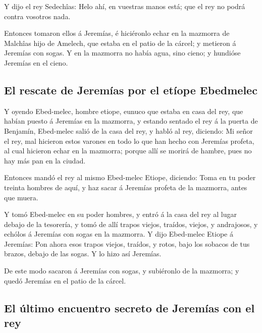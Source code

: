  Y dijo el rey Sedechîas: Helo ahí, en vuestras manos
está; que el rey no podrá contra vosotros nada.

 Entonces tomaron ellos á Jeremías, é hiciéronlo echar en
la mazmorra de Malchîas hijo de Amelech, que estaba en el patio de la
cárcel; y metieron á Jeremías con sogas. Y en la mazmorra no había agua,
sino cieno; y hundióse Jeremías en el cieno.

\hypertarget{el-rescate-de-jeremuxedas-por-el-etuxedope-ebedmelec}{%
\subsection{El rescate de Jeremías por el etíope
Ebedmelec}\label{el-rescate-de-jeremuxedas-por-el-etuxedope-ebedmelec}}

 Y oyendo Ebed-melec, hombre etiope, eunuco que estaba en
casa del rey, que habían puesto á Jeremías en la mazmorra, y estando
sentado el rey á la puerta de Benjamín,  Ebed-melec salió
de la casa del rey, y habló al rey, diciendo:  Mi señor el
rey, mal hicieron estos varones en todo lo que han hecho con Jeremías
profeta, al cual hicieron echar en la mazmorra; porque allí se morirá de
hambre, pues no hay más pan en la ciudad.

 Entonces mandó el rey al mismo Ebed-melec Etiope,
diciendo: Toma en tu poder treinta hombres de aquí, y haz sacar á
Jeremías profeta de la mazmorra, antes que muera.

 Y tomó Ebed-melec en su poder hombres, y entró á la casa
del rey al lugar debajo de la tesorería, y tomó de allí trapos viejos,
traídos, viejos, y andrajosos, y echólos á Jeremías con sogas en la
mazmorra.  Y dijo Ebed-melec Etiope á Jeremías: Pon ahora
esos trapos viejos, traídos, y rotos, bajo los sobacos de tus brazos,
debajo de las sogas. Y lo hizo así Jeremías.

 De este modo sacaron á Jeremías con sogas, y subiéronlo
de la mazmorra; y quedó Jeremías en el patio de la cárcel.

\hypertarget{el-uxfaltimo-encuentro-secreto-de-jeremuxedas-con-el-rey}{%
\subsection{El último encuentro secreto de Jeremías con el
rey}\label{el-uxfaltimo-encuentro-secreto-de-jeremuxedas-con-el-rey}}

